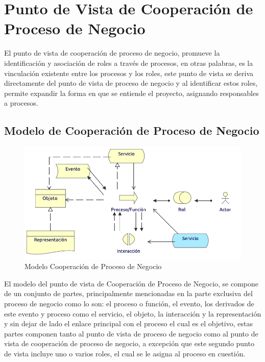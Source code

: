 \section{Punto de Vista de Cooperación de Proceso de Negocio}

El punto de vista de cooperación de proceso de negocio, promueve la identificación y asociación de roles a través de procesos, en otras palabras, es la vinculación existente entre los procesos y los roles, este punto de vista se deriva directamente del punto de vista de proceso de negocio y al identificar estos roles, permite expandir la forma en que se entiende el proyecto, asignando responsables a procesos.

\subsection{Modelo de Cooperación de Proceso de Negocio}
\begin{figure}[h!]
	\centering
	\includegraphics[width=.8\linewidth]{imgs/modelo/ProcesoNegocio}
	\caption{Modelo Cooperación de Proceso de Negocio}
\end{figure}

El modelo del punto de vista de Cooperación de Proceso de Negocio, se compone de un conjunto de partes, principalmente mencionadas en la parte exclusiva del proceso de negocio como lo son: el proceso o función, el evento, los derivados de este evento y proceso como el servicio, el objeto, la interacción y la representación y sin dejar de lado el enlace principal con el proceso el cual es el objetivo, estas partes componen tanto al punto de vista de proceso de negocio como al punto de vista de cooperación de proceso de negocio, a excepción que este segundo punto de vista incluye uno o varios roles, el cual se le asigna al proceso en cuestión.

\clearpage
